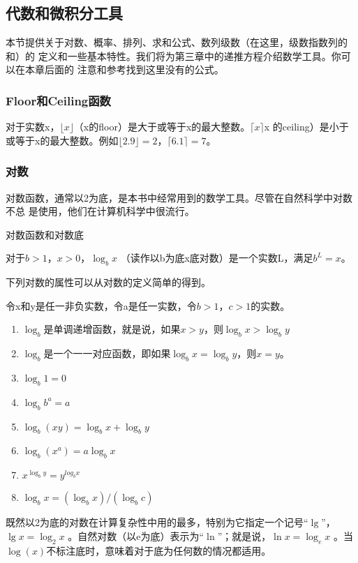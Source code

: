 \subsection{代数和微积分工具}\label{Sec:Calculous}
本节提供关于对数、概率、排列、求和公式、数列级数（在这里，级数指数列的和）的
定义和一些基本特性。我们将为第三章中的递推方程介绍数学工具。你可以在本章后面的
注意和参考找到这里没有的公式。

\subsubsection{Floor和Ceiling函数}
对于实数x，$\lfloor
x\rfloor$（x的floor）是大于或等于x的最大整数。$\lceil x \rceil$x
的ceiling）是小于 或等于x的最大整数。例如$\lfloor 2.9 \rfloor
=2$，$\lceil 6.1 \rceil=7$。
\subsubsection{对数}
对数函数，通常以2为底，是本书中经常用到的数学工具。尽管在自然科学中对数不总
是使用，他们在计算机科学中很流行。

\begin{definition} \label{Def:Logarithms}
    对数函数和对数底

    对于$b>1$，$x>0$，$\log_b x$ （读作以b为底x底对数）是一个实数L，满足$b^L=x$。
\end{definition}
下列对数的属性可以从对数的定义简单的得到。
\begin{lemma}\label{Lemma:LogFunction}
    令x和y是任一非负实数，令a是任一实数，令$b>1$，$c>1$的实数。
    \begin{enumerate}
        \item $\log_b$是单调递增函数，就是说，如果$x>y$，则$\log_b x> \log_b y$
        \item $\log_b$是一个一一对应函数，即如果$\log_b x= \log_b y$，则$x=y$。
        \item $\log_b 1=0$
        \item $\log_b b^a=a$
        \item $\log_b (xy)= \log_b x + \log_b y$
        \item $\log_b (x^a)=a\log_b x$
        \item $x^{\log_b y}= y^{log_b x}$
        \item $\log_b x= (\log_b x) / (\log_b c)$
    \end{enumerate}
\end{lemma}

既然以2为底的对数在计算复杂性中用的最多，特别为它指定一个记号“$\lg$”，
$\lg x =\log_2 x$ 。自然对数（以e为底）表示为“$\ln$”；就是说，$\ln
x= \log_e x$ 。当$\log
(x)$不标注底时，意味着对于底为任何数的情况都适用。


